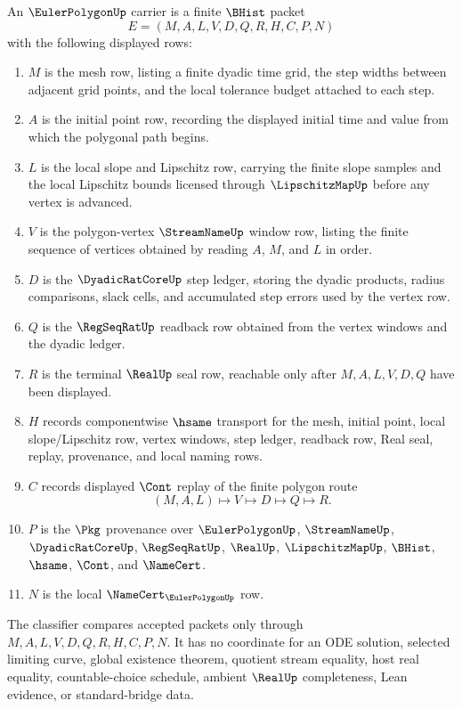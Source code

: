 \begin{definition}
\label{def:euler-polygon-carrier}
An $\EulerPolygonUp$ carrier is a finite $\BHist$ packet
$$
E=(M,A,L,V,D,Q,R,H,C,P,N)
$$
with the following displayed rows:
\begin{enumerate}
\item $M$ is the mesh row, listing a finite dyadic time grid, the step widths between adjacent grid points, and the local tolerance budget attached to each step.
\item $A$ is the initial point row, recording the displayed initial time and value from which the polygonal path begins.
\item $L$ is the local slope and Lipschitz row, carrying the finite slope samples and the local Lipschitz bounds licensed through $\LipschitzMapUp$ before any vertex is advanced.
\item $V$ is the polygon-vertex $\StreamNameUp$ window row, listing the finite sequence of vertices obtained by reading $A$, $M$, and $L$ in order.
\item $D$ is the $\DyadicRatCoreUp$ step ledger, storing the dyadic products, radius comparisons, slack cells, and accumulated step errors used by the vertex row.
\item $Q$ is the $\RegSeqRatUp$ readback row obtained from the vertex windows and the dyadic ledger.
\item $R$ is the terminal $\RealUp$ seal row, reachable only after $M,A,L,V,D,Q$ have been displayed.
\item $H$ records componentwise $\hsame$ transport for the mesh, initial point, local slope/Lipschitz row, vertex windows, step ledger, readback row, Real seal, replay, provenance, and local naming rows.
\item $C$ records displayed $\Cont$ replay of the finite polygon route
$$
(M,A,L)\longmapsto V\longmapsto D\longmapsto Q\longmapsto R .
$$
\item $P$ is the $\Pkg$ provenance over $\EulerPolygonUp$, $\StreamNameUp$, $\DyadicRatCoreUp$, $\RegSeqRatUp$, $\RealUp$, $\LipschitzMapUp$, $\BHist$, $\hsame$, $\Cont$, and $\NameCert$.
\item $N$ is the local $\NameCert_{\EulerPolygonUp}$ row.
\end{enumerate}
The classifier compares accepted packets only through $M,A,L,V,D,Q,R,H,C,P,N$. It has no coordinate for an ODE solution, selected limiting curve, global existence theorem, quotient stream equality, host real equality, countable-choice schedule, ambient $\RealUp$ completeness, Lean evidence, or standard-bridge data.
\end{definition}

